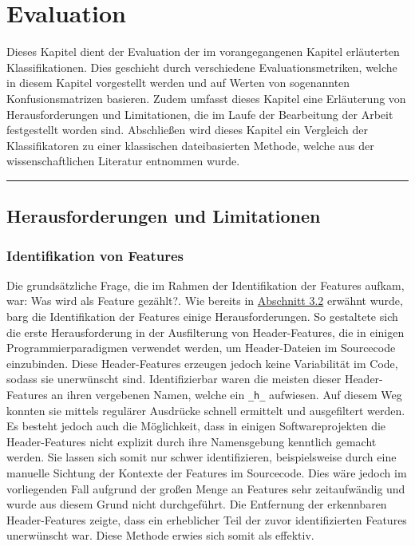 
\chapter{Evaluation}
\label{evaluation}

Dieses Kapitel dient der Evaluation der im vorangegangenen Kapitel erläuterten Klassifikationen. Dies geschieht durch verschiedene Evaluationsmetriken, welche in diesem Kapitel vorgestellt werden und auf Werten von sogenannten Konfusionsmatrizen basieren. Zudem umfasst dieses Kapitel eine Erläuterung von Herausforderungen und Limitationen, die im Laufe der Bearbeitung der Arbeit festgestellt worden sind. Abschließen wird dieses Kapitel ein Vergleich der Klassifikatoren zu einer klassischen dateibasierten Methode, welche aus der wissenschaftlichen Literatur entnommen wurde.
\\
\hrule

\section{Herausforderungen und Limitationen}

\subsection*{Identifikation von Features}

Die grundsätzliche Frage, die im Rahmen der Identifikation der Features aufkam, war: \glqq Was wird als Feature gezählt?\grqq. Wie bereits in \hyperref[construction]{Abschnitt 3.2} erwähnt wurde, barg die Identifikation der Features einige Herausforderungen. So gestaltete sich die erste Herausforderung in der Ausfilterung von \glqq Header-Features\grqq{}, die in einigen Programmierparadigmen verwendet werden, um Header-Dateien im Sourcecode einzubinden. Diese Header-Features erzeugen jedoch keine Variabilität im Code, sodass sie unerwünscht sind. Identifizierbar waren die meisten dieser Header-Features an ihren vergebenen Namen, welche ein \texttt{\_h\_} aufwiesen. Auf diesem Weg konnten sie mittels regulärer Ausdrücke schnell ermittelt und ausgefiltert werden. Es besteht jedoch auch die Möglichkeit, dass in einigen Softwareprojekten die Header-Features nicht explizit durch ihre Namensgebung kenntlich gemacht werden. Sie lassen sich somit nur schwer identifizieren, beispielsweise durch eine manuelle Sichtung der Kontexte der Features im Sourcecode. Dies wäre jedoch im vorliegenden Fall aufgrund der großen Menge an Features sehr zeitaufwändig und wurde aus diesem Grund nicht durchgeführt. Die Entfernung der erkennbaren Header-Features zeigte, dass ein erheblicher Teil der zuvor identifizierten Features unerwünscht war. Diese Methode erwies sich somit als effektiv.


